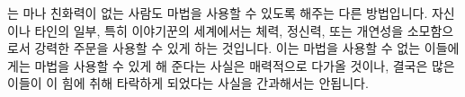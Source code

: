 \documentclass{report}
\begin{document}
	는 마나 친화력이 없는 사람도 마법을 사용할 수 있도록 해주는 다른 방법입니다. 자신이나 타인의 일부, 특히 이야기꾼의 세계에서는 체력, 정신력, 또는 개연성을 소모함으로서 강력한 주문을 사용할 수 있게 하는 것입니다. 이는 마법을 사용할 수 없는 이들에게는 마법을 사용할 수 있게 해 준다는 사실은 매력적으로 다가올 것이나, 결국은 많은 이들이 이 힘에 취해 타락하게 되었다는 사실을 간과해서는 안됩니다.
\end{document}
